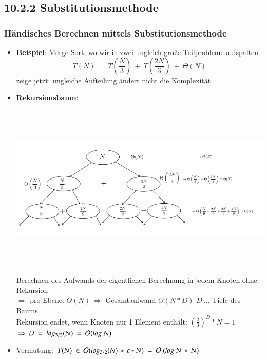     \subsection*{10.2.2 Substitutionsmethode}
    \subsubsection*{Händisches Berechnen mittels Substitutionsmethode}
    \begin{itemize}
        \item \textbf{Beispiel}: Merge Sort, wo wir in zwei ungleich große Teilprobleme aufspalten \\
        \[ T(N)\ =\ T\left(\frac{N}{3}\right)\ +\ T\left(\frac{2N}{3}\right)\ +\ \Theta(N)\]
        zeige jetzt: ungleiche Aufteilung ändert nicht die Komplexität
        \item \textbf{Rekursionsbaum}:\\
        \begin{center}
        \includegraphics[width=15cm,height=8cm,keepaspectratio]{./Pictures/Substitutionsmethode.png}
        \end{center}
        Berechnen des Aufwands der eigentlichen Berechnung in jedem Knoten ohne Rekursion\\
        $\Rightarrow$ pro Ebene: $\Theta(N) \ \Rightarrow$ Gesamtaufwand $\Theta(N*D)$ $D\ \dots$ Tiefe des Baums \\
        Rekursion endet, wenn Knoten nur 1 Element enthält: $\left(\frac{2}{3}\right)^D * N = 1$\\
        \hspace*{1cm} $\Rightarrow\ D\ =\ log_{3/2}(N)\ = \ \bigO{}(log\ N)$
        \item Vermutung: $T(N)\ \in\ \bigO{}(log_{3/2}(N)\ *\ c*N)\ =\ \bigO{}\ (log\ N\ *\ N)$\\

\end{itemize}
